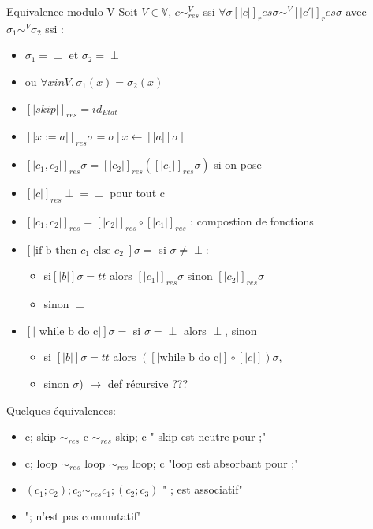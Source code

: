 \documentclass[10pt,a4paper]{article}
\newcommand{\semm}[1]{\left[| #1 | \right]}
\newcommand{\V}{\mathbb{V}}
\begin{document}
\begin{definition}{Equivalence modulo V} Soit $V \in \V$, 
$c \sim^V_{res}$ ssi $\forall \sigma [| c |]_res \sigma \sim^V [| c' |]_res \sigma$
avec $\sigma_1 \sim^V \sigma_2$ ssi :\begin{itemize}
\item $\sigma_1 = \perp$ et $\sigma_2 = \perp$
\item ou  $\forall x in V, \sigma_1(x) = \sigma_2(x)$
\end{itemize}
\end{definition}
\begin{itemize}
\item $\semm{skip}_{res} = id_{Etat}$
\item $\semm{ x := a }_{res} \sigma = \sigma [ x \leftarrow \semm{a} \sigma ]$
\item $\semm{c_1, c_2 }_{res} \sigma = \semm{c_2 }_{res} (\semm{c_1}_{res} \sigma)$ si on pose  \item $\semm{c}_{res} \perp = \perp$ pour tout c
\item $\semm{c_1, c_2 }_{res} = \semm{c_2 }_{res} \circ \semm{c_1}_{res}$ : compostion de fonctions
\item $\semm{\text{if b then }c_1\text{ else }c_2 } \sigma =$ si $\sigma \neq \perp :$
\begin{itemize}
\item si$ \semm{b} \sigma = tt$ alors $\semm{c_1}_{res} \sigma$ sinon  $\semm{c_2}_{res} \sigma$
\item sinon $\perp$
\end{itemize}
\item $\semm{\text{ while b do c} } \sigma=$ si $\sigma = \perp$ alors $\perp$, sinon 
\begin{itemize}
\item si $\semm{b}\sigma = tt$ alors $(\semm{\text{while b do c} } \circ \semm{c}) \sigma$, 
\item sinon $\sigma$) $\longrightarrow$ def récursive ???
\end{itemize}
\end{itemize}


Quelques équivalences:\begin{itemize}
\item c; skip $\sim_{res}$ c $\sim_{res}$ skip; c " skip est neutre pour ;"
\item c; loop $\sim_{res}$ loop $\sim_{res}$ loop; c "loop est absorbant pour ;"
\item $(c_1; c_2); c_3 \sim_{res} c_1; (c_2;c_3)$  " ; est associatif"
\item  "; n'est pas commutatif"\\
 \end{itemize}
\end{document}
